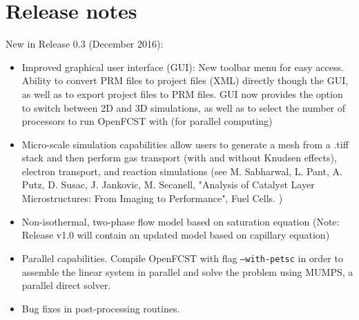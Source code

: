 \section{Release notes} \label{main_changes}

New in Release 0.3 (December 2016):
\begin{itemize}
 \item Improved graphical user interface (GUI): New toolbar menu for easy access. Ability to convert PRM files to project files (XML) directly though the GUI, as well as to export project files to PRM files. GUI now provides the option to switch between 2D and 3D simulations, as well as to select the number of processors to run OpenFCST with (for parallel computing)
 \item Micro-scale simulation capabilities allow users to generate a mesh from a .tiff stack and then perform gas transport (with and without Knudsen effects), electron transport, and reaction simulations (see M. Sabharwal, L. Pant, A. Putz, D. Susac, J. Jankovic, M. Secanell, "Analysis of Catalyst Layer Microstructures: From Imaging to Performance", Fuel Cells. )
 \item Non-isothermal, two-phase flow model based on saturation equation (Note: Release v1.0 will contain an updated model based on capillary equation)
 \item Parallel capabilities. Compile OpenFCST with flag \texttt{--with-petsc} in order to assemble the linear system in parallel and solve the problem using MUMPS, a parallel direct solver.
 \item Bug fixes in post-processing routines.
\end{itemize}
 
